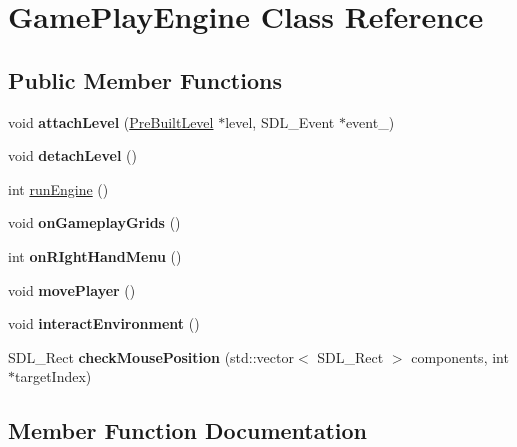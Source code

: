 \hypertarget{class_game_play_engine}{}\section{Game\+Play\+Engine Class Reference}
\label{class_game_play_engine}
\subsection*{Public Member Functions}
\begin{DoxyCompactItemize}
\item 
\hypertarget{class_game_play_engine_a300998530f28b86679ced3b42b6ccf62}{}\label{class_game_play_engine_a300998530f28b86679ced3b42b6ccf62} 
void {\bfseries attach\+Level} (\hyperlink{class_pre_built_level}{Pre\+Built\+Level} $\ast$level, S\+D\+L\+\_\+\+Event $\ast$event\+\_\+)
\item 
\hypertarget{class_game_play_engine_a2b5f4dc886288daecaa2be9b9a8ca287}{}\label{class_game_play_engine_a2b5f4dc886288daecaa2be9b9a8ca287} 
void {\bfseries detach\+Level} ()
\item 
int \hyperlink{class_game_play_engine_a5c155091580329513e92d395b11d4940}{run\+Engine} ()
\item 
\hypertarget{class_game_play_engine_af88c9c9fff562ba552986ab15e6ad8ce}{}\label{class_game_play_engine_af88c9c9fff562ba552986ab15e6ad8ce} 
void {\bfseries on\+Gameplay\+Grids} ()
\item 
\hypertarget{class_game_play_engine_a85db5a21ac09903aa84fc35378b273ea}{}\label{class_game_play_engine_a85db5a21ac09903aa84fc35378b273ea} 
int {\bfseries on\+R\+Ight\+Hand\+Menu} ()
\item 
\hypertarget{class_game_play_engine_a9070c110ca3fb2f66c8fd00aee968b75}{}\label{class_game_play_engine_a9070c110ca3fb2f66c8fd00aee968b75} 
void {\bfseries move\+Player} ()
\item 
\hypertarget{class_game_play_engine_a2a0f5663a43825bbd815d6bfe92bd8fb}{}\label{class_game_play_engine_a2a0f5663a43825bbd815d6bfe92bd8fb} 
void {\bfseries interact\+Environment} ()
\item 
\hypertarget{class_game_play_engine_a2cbd6100775c2a55b46c4f3a29d166b1}{}\label{class_game_play_engine_a2cbd6100775c2a55b46c4f3a29d166b1} 
S\+D\+L\+\_\+\+Rect {\bfseries check\+Mouse\+Position} (std\+::vector$<$ S\+D\+L\+\_\+\+Rect $>$ components, int $\ast$target\+Index)
\end{DoxyCompactItemize}


\subsection{Member Function Documentation}
\hypertarget{class_game_play_engine_a5c155091580329513e92d395b11d4940}{}\label{class_game_play_engine_a5c155091580329513e92d395b11d4940} 
